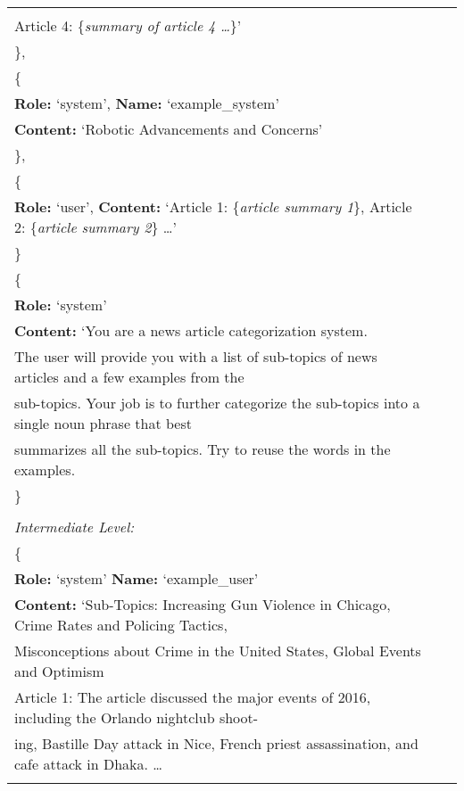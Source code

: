 \begin{center}
\begin{tabular}{ | p{3.0cm} | p{3.0cm} | p{13cm} | }
{    \quad Article 3: \{\textit{summary of article 3 \dots}\}\\ 
    \quad Article 4: \{\textit{summary of article 4 \dots}\}' \\
    \},\\
    \{\\
    \quad\textbf{Role:} `system', \textbf{Name:} `example\_system'\\ 
    \quad\textbf{Content:} `Robotic Advancements and Concerns'\\
    \}, \\
    \{\\
    \quad\textbf{Role:} `user', \textbf{Content:} `Article 1: \{\textit{article summary 1}\}, Article 2: \{\textit{article summary 2}\} \dots'\\ 
    \} \\
    \{ \\
    \quad\textbf{Role:} `system' \\
    \quad\textbf{Content:} `You are a news article categorization system. \\
    \quad The user will provide you with a list of sub-topics of news articles and a few examples from the\\
    \quad sub-topics. Your job is to further categorize the sub-topics into a single noun phrase that best\\
    \quad summarizes all the sub-topics. Try to reuse the words in the examples.\\
    \} \\ \\
    \hline
    \textit{Intermediate Level:}\\
    \{ \\
    \quad\textbf{Role:} `system' \quad\textbf{Name:} `example\_user'\\ 
    \quad\textbf{Content:} `Sub-Topics: Increasing Gun Violence in Chicago, Crime Rates and Policing Tactics,\\
    \quad Misconceptions about Crime in the United States, Global Events and Optimism\\
    \quad Article 1: The article discussed the major events of 2016, including the Orlando nightclub shoot-\\
    \quad ing, Bastille Day attack in Nice, French priest assassination, and cafe attack in Dhaka. \dots\\
}
\end{tabular}
\end{center}
